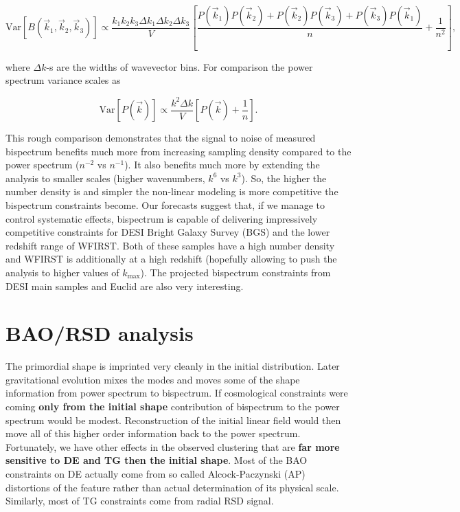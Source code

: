 \begin{equation}
\mathrm{Var}\left[B(\vec{k}_1,\vec{k}_2,\vec{k}_3)\right] \propto
\frac{k_1k_2k_3\Delta k_1\Delta k_2\Delta
k_3}{V}\left[\frac{P(\vec{k}_1)P(\vec{k}_2) + P(\vec{k}_2)P(\vec{k}_3) +
P(\vec{k}_3)P(\vec{k}_1)}{n} + \frac{1}{n^2}\right], 
\end{equation} 

where $\Delta k$-s are the widths of wavevector bins. For comparison the power
spectrum variance scales as 

\begin{equation}
\mathrm{Var}\left[P(\vec{k})\right] \propto \frac{k^2\Delta
k}{V}\left[P(\vec{k}) + \frac{1}{n}\right].  
\end{equation}  

This rough comparison demonstrates that the signal to noise of measured
bispectrum benefits much more from increasing sampling density  compared to
the power spectrum ($n^{-2}$ vs $n^{-1}$). It also benefits much more by
extending the analysis to smaller scales (higher wavenumbers, $k^6$ vs
$k^3$). So, the higher the number density is and simpler the non-linear
modeling is more competitive the bispectrum constraints become. Our forecasts
suggest that, if we manage to control systematic effects, bispectrum is capable
of delivering impressively competitive constraints for DESI Bright Galaxy
Survey (BGS) and the lower redshift range of WFIRST. Both of these samples have
a high number density and WFIRST is additionally at a high redshift (hopefully
allowing to push the analysis to higher values of $k_\mathrm{max}$). The
projected bispectrum constraints from DESI main samples and Euclid are also
very interesting.

\section{BAO/RSD analysis}

The primordial shape is imprinted very cleanly in the initial distribution.
Later gravitational evolution mixes the modes and moves some of the shape
information from power spectrum to bispectrum. If cosmological constraints
were coming \textbf{only from the initial shape} contribution of bispectrum to
the power spectrum would be modest. Reconstruction of the initial
linear field would then move all of this higher order information back to the
power spectrum. Fortunately, we have other effects in the observed clustering
that are \textbf{far more sensitive to DE and TG then the initial shape}. Most
of the BAO constraints on DE actually come from so called Alcock-Paczynski (AP)
distortions of the feature rather than actual determination of its physical
scale. Similarly, most of TG constraints come from radial RSD signal.

